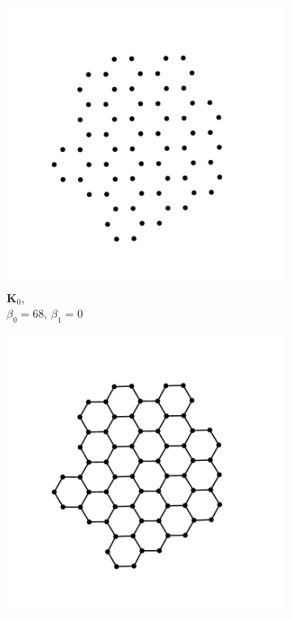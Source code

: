 \begin{figure}[tb]
	\centering
     
      \begin{subfigure}[b]{0.22\textwidth}
         \centering
         \includegraphics[width=\textwidth]{./figures/ph/ph_ex_crys_0.pdf}
         \caption{$\mathbf{K}_0$,\\ $\beta_0=68$, $\beta_1=0$}
         \label{fig:phexa}
     \end{subfigure}
     \hfill
      \begin{subfigure}[b]{0.22\textwidth}
         \centering
         \includegraphics[width=\textwidth]{./figures/ph/ph_ex_crys_12.pdf}

\end{subfigure}
\end{figure}
